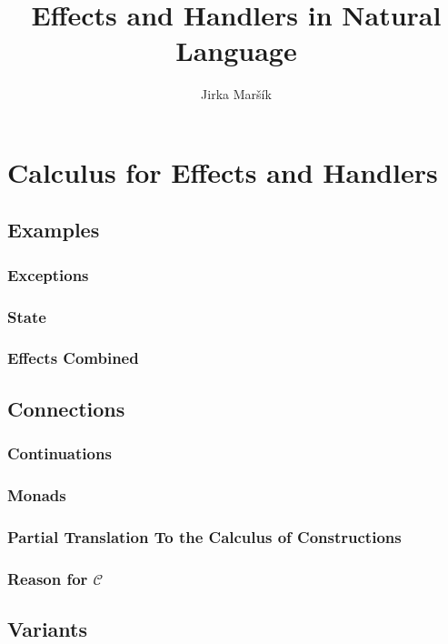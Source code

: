 \documentclass{report}
\title{Effects and Handlers in Natural Language}
\author{Jirka Maršík}
\begin{document}
\maketitle

\tableofcontents



\part{Calculus for Effects and Handlers}



\chapter{Examples}
\section{Exceptions}
\section{State}
\section{Effects Combined}



\chapter{Connections}
\section{Continuations}
\section{Monads}
\section{Partial Translation To the Calculus of Constructions}
\section{Reason for $\mathcal{C}$}

\chapter{Variants}
\end{document}
